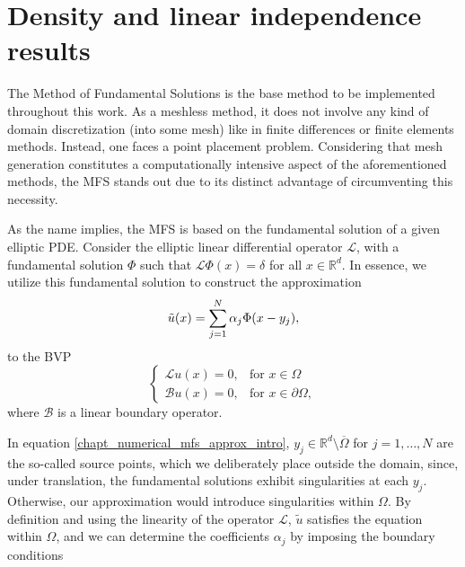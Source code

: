 \label{chap:numerical}

\section{Density and linear independence results}\label{density_proofs_section}

The Method of Fundamental Solutions is the base method to be implemented throughout this work. As a meshless method, it does not involve any kind of domain discretization (into some mesh) like in finite differences or finite elements methods. Instead, one faces a point placement problem. Considering that mesh generation constitutes a computationally intensive aspect of the aforementioned methods, the \ac{MFS} stands out due to its distinct advantage of circumventing this necessity.

As the name implies, the \ac{MFS} is based on the fundamental solution of a given elliptic \ac{PDE}. Consider the elliptic linear differential operator $\mathcal{L}$, with a fundamental solution $\Phi$ such that $\mathcal{L}\Phi(x) = \delta$ for all $x \in \mathbb{R}^d$. In essence, we utilize this fundamental solution to construct the approximation
\begin{equation}\label{chapt_numerical_mfs_approx_intro}
\Tilde{u}(x) = \sum_{j=1}^{N}\alpha_j \Phi(x-y_j),
\end{equation}
to the \ac{BVP}
\[
\begin{cases}
    \mathcal{L}u(x) = 0, & \text{for } x \in \Omega\\
    \mathcal{B}u(x) = 0, & \text{for } x \in \partial\Omega,
\end{cases}
\]
where $\mathcal{B}$ is a linear boundary operator.

In equation \eqref{chapt_numerical_mfs_approx_intro}, $y_j \in \mathbb{R}^d\setminus \overline{\Omega}$ for $j=1,\dots, N$ are the so-called source points, which we deliberately place outside the domain, since, under translation, the fundamental solutions exhibit singularities at each $y_j$. Otherwise, our approximation would introduce singularities within $\Omega$. By definition and using the linearity of the operator $\mathcal{L}$, $\tilde{u}$ satisfies the equation within $\Omega$, and we can determine the coefficients $\alpha_j$ by imposing the boundary conditions


